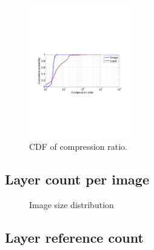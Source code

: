 \begin{figure}
	\centering
	\includegraphics[width=0.4\textwidth]{graphs/compress-ratio-cdf.pdf}
	\caption{CDF of compression ratio.
	}
	\label{fig:compress-ratio}
\end{figure}

\subsection{Layer count per image}

\begin{figure}[!t]
	\centering
	\caption{Image size distribution}
	\label{fig:image-size}
\end{figure}

\subsection{Layer reference count}


